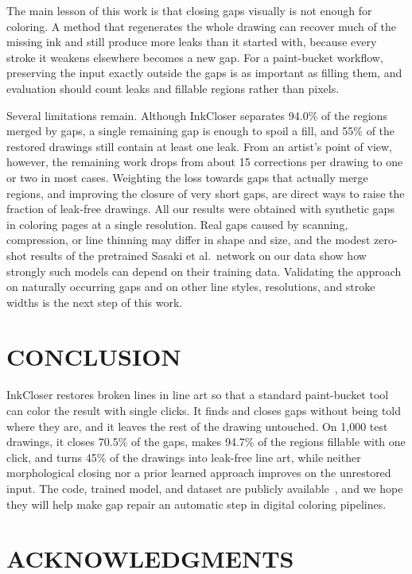 \documentclass{IEEEcsmag}
\begin{document}
The main lesson of this work is that closing gaps visually is not enough for
coloring. A method that regenerates the whole drawing can recover much of the
missing ink and still produce more leaks than it started with, because every stroke
it weakens elsewhere becomes a new gap. For a paint-bucket workflow, preserving the
input exactly outside the gaps is as important as filling them, and evaluation should
count leaks and fillable regions rather than pixels.

Several limitations remain. Although InkCloser separates 94.0\% of the regions merged
by gaps, a single remaining gap is enough to spoil a fill, and 55\% of the restored
drawings still contain at least one leak. From an artist's point of view, however,
the remaining work drops from about 15 corrections per drawing to one or two in most
cases. Weighting the loss towards gaps that actually merge regions, and improving the
closure of very short gaps, are direct ways to raise the fraction of leak-free
drawings. All our results were obtained with synthetic gaps in coloring pages at a
single resolution. Real gaps caused by scanning, compression, or line thinning may
differ in shape and size, and the modest zero-shot results of the pretrained Sasaki
et al.\ network on our data show how strongly such models can depend on their
training data. Validating the approach on naturally occurring gaps and on other line
styles, resolutions, and stroke widths is the next step of this work.

\section{CONCLUSION}

InkCloser restores broken lines in line art so that a standard paint-bucket tool can
color the result with single clicks. It finds and closes gaps without being told
where they are, and it leaves the rest of the drawing untouched. On 1,000 test
drawings, it closes 70.5\% of the gaps, makes 94.7\% of the regions fillable with one
click, and turns 45\% of the drawings into leak-free line art, while neither
morphological closing nor a prior learned approach improves on the unrestored input.
The code, trained model, and dataset are publicly
available~\cite{codeInkCloser,datasetInkCloser}, and we hope they will help make gap
repair an automatic step in digital coloring pipelines.

\section{ACKNOWLEDGMENTS}
\end{document}
